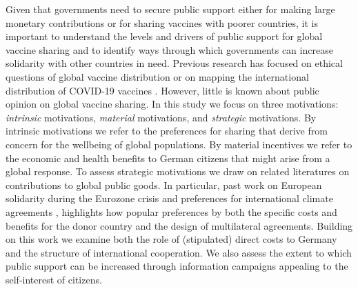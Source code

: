 \documentclass[]{article}
\begin{document}
Given that governments need to secure public support either for making large monetary contributions or for sharing vaccines with poorer countries, it is important to understand the levels and drivers of public support for global vaccine sharing and to identify ways through which governments can increase solidarity with other countries in need. Previous research has focused on ethical questions of global vaccine distribution \citep{Emanuel2020,Jecker2021} or on  mapping the international distribution of COVID-19 vaccines \citep[e.g.][]{Massinga2021,Katz2021}. However, little is known about public opinion on global vaccine sharing. In this study we focus on three motivations: \textit{intrinsic} motivations, \textit{material} motivations, and \textit{strategic} motivations. By intrinsic motivations we refer to the preferences for sharing that derive from concern for the wellbeing of global populations. By material incentives we refer to the economic and health benefits to German citizens that might arise from a global response. To assess strategic motivations we draw on related literatures on contributions to global public goods. In particular, past work on European solidarity during the Eurozone crisis \citep{Bechtel2017,Kuhn2018,Kuhn2020,Stoeckel2018} and preferences for international climate agreements \citep{Bechtel2019},  highlights how popular preferences by both the specific costs and benefits for the donor country and the design of multilateral agreements. Building on this work we examine both the role of (stipulated) direct costs to Germany and the structure of international cooperation.  We also assess the extent to which public support can be increased through information campaigns appealing to the self-interest of citizens. 




\end{document}
